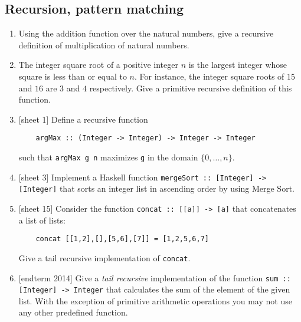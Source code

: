 \documentclass{article}
\begin{document}
\subsection{Recursion, pattern matching}
\begin{enumerate}
\item \cite[p. 86]{thompson} Using the addition function over the natural numbers, give a recursive definition of multiplication of natural numbers.

\item \cite[p. 86]{thompson} The integer square root of a positive integer $n$ is the largest integer whose square is less than or equal to $n$. For instance, the integer square roots of $15$ and $16$ are $3$ and $4$ respectively. Give a primitive recursive definition of this function.

\item {[sheet 1]} Define a recursive function
\begin{verbatim}
    argMax :: (Integer -> Integer) -> Integer -> Integer
\end{verbatim}
such that \verb|argMax g n| maximizes \verb|g| in the domain $\{0,\dots,n\}$.

\item {[sheet 3]} Implement a Haskell function \verb|mergeSort :: [Integer] -> [Integer]| that sorts an integer list in ascending order by using Merge Sort.

\item {[sheet 15]} Consider the function \verb|concat :: [[a]] -> [a]| that concatenates a list of lists:
\begin{verbatim}
    concat [[1,2],[],[5,6],[7]] = [1,2,5,6,7]
\end{verbatim}
Give a tail recursive implementation of \verb|concat|.

\item {[endterm 2014]} Give a \textit{tail recursive} implementation of the function \verb|sum :: [Integer] -> Integer| that calculates the sum of the element of the given list. With the exception of primitive arithmetic operations you may not use any other predefined function.
\end{enumerate}
\end{document}
